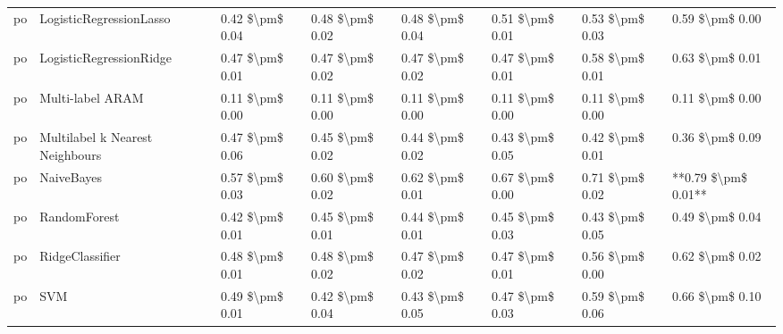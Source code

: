\begin{tabular}{llllllll}
      po &         LogisticRegressionLasso &     0.42 \$\textbackslash pm\$ 0.04 &           0.48 \$\textbackslash pm\$ 0.02 &       0.48 \$\textbackslash pm\$ 0.04 &        0.51 \$\textbackslash pm\$ 0.01 &                         0.53 \$\textbackslash pm\$ 0.03 &     0.59 \$\textbackslash pm\$ 0.00 \\
      po &         LogisticRegressionRidge &     0.47 \$\textbackslash pm\$ 0.01 &           0.47 \$\textbackslash pm\$ 0.02 &       0.47 \$\textbackslash pm\$ 0.02 &        0.47 \$\textbackslash pm\$ 0.01 &                         0.58 \$\textbackslash pm\$ 0.01 &     0.63 \$\textbackslash pm\$ 0.01 \\
      po &                Multi-label ARAM &     0.11 \$\textbackslash pm\$ 0.00 &           0.11 \$\textbackslash pm\$ 0.00 &       0.11 \$\textbackslash pm\$ 0.00 &        0.11 \$\textbackslash pm\$ 0.00 &                         0.11 \$\textbackslash pm\$ 0.00 &     0.11 \$\textbackslash pm\$ 0.00 \\
      po & Multilabel k Nearest Neighbours &     0.47 \$\textbackslash pm\$ 0.06 &           0.45 \$\textbackslash pm\$ 0.02 &       0.44 \$\textbackslash pm\$ 0.02 &        0.43 \$\textbackslash pm\$ 0.05 &                         0.42 \$\textbackslash pm\$ 0.01 &     0.36 \$\textbackslash pm\$ 0.09 \\
      po &                      NaiveBayes &     0.57 \$\textbackslash pm\$ 0.03 &           0.60 \$\textbackslash pm\$ 0.02 &       0.62 \$\textbackslash pm\$ 0.01 &        0.67 \$\textbackslash pm\$ 0.00 &                         0.71 \$\textbackslash pm\$ 0.02 & **0.79 \$\textbackslash pm\$ 0.01** \\
      po &                    RandomForest &     0.42 \$\textbackslash pm\$ 0.01 &           0.45 \$\textbackslash pm\$ 0.01 &       0.44 \$\textbackslash pm\$ 0.01 &        0.45 \$\textbackslash pm\$ 0.03 &                         0.43 \$\textbackslash pm\$ 0.05 &     0.49 \$\textbackslash pm\$ 0.04 \\
      po &                 RidgeClassifier &     0.48 \$\textbackslash pm\$ 0.01 &           0.48 \$\textbackslash pm\$ 0.02 &       0.47 \$\textbackslash pm\$ 0.02 &        0.47 \$\textbackslash pm\$ 0.01 &                         0.56 \$\textbackslash pm\$ 0.00 &     0.62 \$\textbackslash pm\$ 0.02 \\
      po &                             SVM &     0.49 \$\textbackslash pm\$ 0.01 &           0.42 \$\textbackslash pm\$ 0.04 &       0.43 \$\textbackslash pm\$ 0.05 &        0.47 \$\textbackslash pm\$ 0.03 &                         0.59 \$\textbackslash pm\$ 0.06 &     0.66 \$\textbackslash pm\$ 0.10 \\

\end{tabular}
